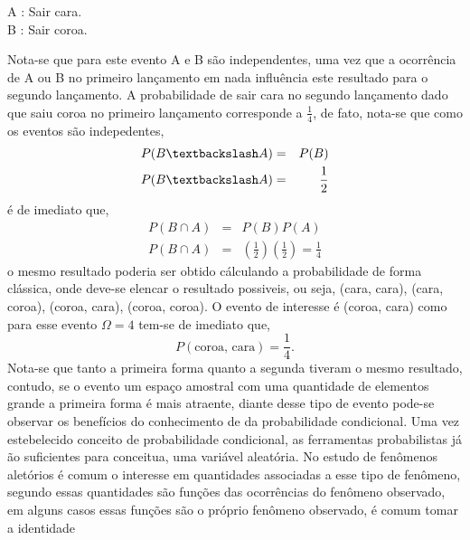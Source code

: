    \vspace{0.5cm}
   \hspace{4cm}
   \begin{minipage}{9cm}
	 A : Sair cara. \\
	 B : Sair coroa. \\
   \end{minipage}
   Nota-se que para este evento A e B s\~{a}o independentes, uma vez que a ocorr\^{e}ncia de A ou B no primeiro lan\c{c}amento em nada
   influ\^{e}ncia este resultado para o segundo lan\c{c}amento. A probabilidade de sair cara no segundo lan\c{c}amento dado que saiu
   coroa no primeiro lan\c{c}amento corresponde a $\frac {1} {4}$, de fato, nota-se que como os eventos s\~{a}o indepedentes, 
   \begin{eqnarray*}
	 P(B \textbackslash A) &=&  P(B) \\ \nonumber
	 P(B \textbackslash A) &=&  \frac{1} {2} \nonumber
   \end{eqnarray*}
   \'{e} de imediato que,
   \begin{eqnarray*}
	 P(B \cap A ) &=&  P(B)P(A) \\
	 P(B \cap A ) &=&  \left( \frac{1} {2}  \right) \left( \frac{1} {2}  \right) = \frac{1} {4}
   \end{eqnarray*}
   o mesmo resultado poderia ser obtido c\'{a}lculando a probabilidade de forma cl\'{a}ssica, onde deve-se elencar o resultado possiveis,
   ou seja, (cara, cara), (cara, coroa), (coroa, cara), (coroa, coroa). O evento de interesse \'{e} (coroa, cara) como para esse evento
    $\Omega = 4 $ tem-se de imediato que,
	\begin{equation*}
	  P( \textrm{coroa, cara}) = \frac {1} {4}.
	\end{equation*}
	Nota-se que tanto a primeira forma quanto a segunda tiveram o mesmo resultado, contudo, se o evento um espa\c{c}o amostral com uma
	quantidade de elementos grande a primeira forma \'{e} mais atraente, diante desse tipo de evento pode-se observar os benef\'{i}cios
	do conhecimento de da probabilidade condicional.
	Uma vez estebelecido conceito de probabilidade condicional, as ferramentas probabilistas j\'{a} \~{a}o suficientes para conceitua, uma
	vari\'{a}vel aleat\'{o}ria. No estudo de fen\^{o}menos alet\'{o}rios \'{e} comum o interesse em quantidades associadas a esse
	tipo de fen\^{o}meno, segundo \cite{magalhaes} essas quantidades s\~{a}o fun\c{c}\~{o}es das ocorr\^{e}ncias do fen\^{o}meno
	observado, em alguns casos essas fun\c{c}\~{o}es s\~{a}o o pr\'{o}prio fen\^{o}meno observado, \'{e} comum tomar a identidade
